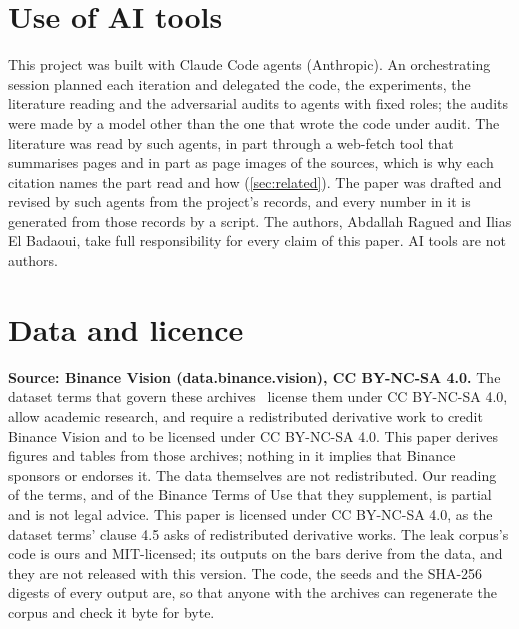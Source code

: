 \documentclass[11pt]{article}
\begin{document}
\section{Use of AI tools}\label{sec:ai}
This project was built with Claude Code agents (Anthropic). An orchestrating session planned each
iteration and delegated the code, the experiments, the literature reading and the adversarial audits
to agents with fixed roles; the audits were made by a model other than the one that wrote the code
under audit. The literature was read by such agents, in part through a web-fetch tool that
summarises pages and in part as page images of the sources, which is why each citation names the
part read and how (\cref{sec:related}). The paper was drafted and revised by such agents from the
project's records, and every number in it is generated from those records by a script.
The authors, Abdallah Ragued and Ilias El Badaoui, take full responsibility for every claim of
this paper. AI tools are not authors.

\section{Data and licence}\label{sec:data}
\textbf{Source: Binance Vision (data.binance.vision), CC BY-NC-SA 4.0.} The dataset terms that govern
these archives~\cite{binancevisionterms} %
license them under CC BY-NC-SA 4.0, allow academic research, and require a redistributed derivative
work to credit Binance Vision and to be licensed under CC BY-NC-SA 4.0. This paper derives figures
and tables from those archives; nothing in it implies that Binance sponsors or endorses it. The
data themselves are not redistributed. Our reading of the terms, and of the Binance Terms of Use
that they supplement, is partial and is not legal advice. This paper is licensed under
CC BY-NC-SA 4.0, as the dataset terms' clause 4.5 asks of redistributed derivative works.
The leak corpus's code is ours and MIT-licensed; its outputs on the bars derive from the data, and
they are not released with this version. The code, the seeds and the SHA-256 digests of every
output are, so that anyone with the archives can regenerate the corpus and check it byte for byte.



\end{document}
